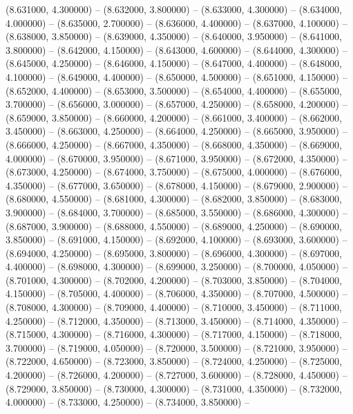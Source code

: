 (8.631000, 4.300000) -- 
(8.632000, 3.800000) -- 
(8.633000, 4.300000) -- 
(8.634000, 4.000000) -- 
(8.635000, 2.700000) -- 
(8.636000, 4.400000) -- 
(8.637000, 4.100000) -- 
(8.638000, 3.850000) -- 
(8.639000, 4.350000) -- 
(8.640000, 3.950000) -- 
(8.641000, 3.800000) -- 
(8.642000, 4.150000) -- 
(8.643000, 4.600000) -- 
(8.644000, 4.300000) -- 
(8.645000, 4.250000) -- 
(8.646000, 4.150000) -- 
(8.647000, 4.400000) -- 
(8.648000, 4.100000) -- 
(8.649000, 4.400000) -- 
(8.650000, 4.500000) -- 
(8.651000, 4.150000) -- 
(8.652000, 4.400000) -- 
(8.653000, 3.500000) -- 
(8.654000, 4.400000) -- 
(8.655000, 3.700000) -- 
(8.656000, 3.000000) -- 
(8.657000, 4.250000) -- 
(8.658000, 4.200000) -- 
(8.659000, 3.850000) -- 
(8.660000, 4.200000) -- 
(8.661000, 3.400000) -- 
(8.662000, 3.450000) -- 
(8.663000, 4.250000) -- 
(8.664000, 4.250000) -- 
(8.665000, 3.950000) -- 
(8.666000, 4.250000) -- 
(8.667000, 4.350000) -- 
(8.668000, 4.350000) -- 
(8.669000, 4.000000) -- 
(8.670000, 3.950000) -- 
(8.671000, 3.950000) -- 
(8.672000, 4.350000) -- 
(8.673000, 4.250000) -- 
(8.674000, 3.750000) -- 
(8.675000, 4.000000) -- 
(8.676000, 4.350000) -- 
(8.677000, 3.650000) -- 
(8.678000, 4.150000) -- 
(8.679000, 2.900000) -- 
(8.680000, 4.550000) -- 
(8.681000, 4.300000) -- 
(8.682000, 3.850000) -- 
(8.683000, 3.900000) -- 
(8.684000, 3.700000) -- 
(8.685000, 3.550000) -- 
(8.686000, 4.300000) -- 
(8.687000, 3.900000) -- 
(8.688000, 4.550000) -- 
(8.689000, 4.250000) -- 
(8.690000, 3.850000) -- 
(8.691000, 4.150000) -- 
(8.692000, 4.100000) -- 
(8.693000, 3.600000) -- 
(8.694000, 4.250000) -- 
(8.695000, 3.800000) -- 
(8.696000, 4.300000) -- 
(8.697000, 4.400000) -- 
(8.698000, 4.300000) -- 
(8.699000, 3.250000) -- 
(8.700000, 4.050000) -- 
(8.701000, 4.300000) -- 
(8.702000, 4.200000) -- 
(8.703000, 3.850000) -- 
(8.704000, 4.150000) -- 
(8.705000, 4.400000) -- 
(8.706000, 4.350000) -- 
(8.707000, 4.500000) -- 
(8.708000, 4.300000) -- 
(8.709000, 4.400000) -- 
(8.710000, 3.450000) -- 
(8.711000, 4.250000) -- 
(8.712000, 4.350000) -- 
(8.713000, 3.450000) -- 
(8.714000, 4.350000) -- 
(8.715000, 4.300000) -- 
(8.716000, 4.300000) -- 
(8.717000, 4.150000) -- 
(8.718000, 3.700000) -- 
(8.719000, 4.050000) -- 
(8.720000, 3.500000) -- 
(8.721000, 3.950000) -- 
(8.722000, 4.650000) -- 
(8.723000, 3.850000) -- 
(8.724000, 4.250000) -- 
(8.725000, 4.200000) -- 
(8.726000, 4.200000) -- 
(8.727000, 3.600000) -- 
(8.728000, 4.450000) -- 
(8.729000, 3.850000) -- 
(8.730000, 4.300000) -- 
(8.731000, 4.350000) -- 
(8.732000, 4.000000) -- 
(8.733000, 4.250000) -- 
(8.734000, 3.850000) -- 
